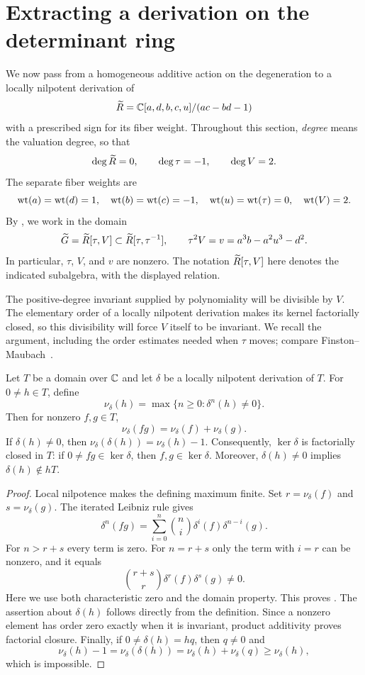 \section{Extracting a derivation on the determinant ring}
\label{sec:reduction}

We now pass from a homogeneous additive action on the degeneration to a
locally nilpotent derivation of
\[
  \widetilde R=\mathbb C[a,d,b,c,u]/(ac-bd-1)
\]
with a prescribed sign for its fiber weight.  Throughout this section,
\emph{degree} means the valuation degree, so that
\[
  \deg \widetilde R=0,\qquad \deg\tau=-1,\qquad \deg V=2.
\]
The separate fiber weights are
\[
  \operatorname{wt}(a)=\operatorname{wt}(d)=1,\quad \operatorname{wt}(b)=\operatorname{wt}(c)=-1,\quad
  \operatorname{wt}(u)=\operatorname{wt}(\tau)=0,\quad \operatorname{wt}(V)=2.
\]
By , we work in the domain
\begin{equation}\label{red:ring}
  \widetilde G=\widetilde R[\tau,V]\subset\widetilde R[\tau,\tau^{-1}],
  \qquad \tau^2V=v=a^3b-a^2u^3-d^2.
\end{equation}
In particular, $\tau$, $V$, and $v$ are nonzero.  The notation
$\widetilde R[\tau,V]$ here denotes the indicated subalgebra, with the displayed
relation.

The positive-degree invariant supplied by polynomiality will be
divisible by $V$. The elementary order of a locally nilpotent
derivation makes its kernel factorially closed, so this divisibility
will force $V$ itself to be invariant. We recall the argument,
including the order estimates needed when $\tau$ moves; compare
Finston--Maubach~\cite[Lemma~1.1]{FinstonMaubach}.

\begin{lemma}
\label{lem:lnd-order}
Let $T$ be a domain over $\mathbb C$ and let $\delta$ be a locally nilpotent
derivation of $T$.  For $0\ne h\in T$, define
\[
  \nu_\delta(h)=\max\{n\ge0:\delta^n(h)\ne0\}.
\]
Then for nonzero $f,g\in T$,
\begin{equation}\label{red:order-product}
  \nu_\delta(fg)=\nu_\delta(f)+\nu_\delta(g).
\end{equation}
If $\delta(h)\ne0$, then
$\nu_\delta(\delta(h))=\nu_\delta(h)-1$.
Consequently, $\ker\delta$ is factorially closed in $T$: if
$0\ne fg\in\ker\delta$, then $f,g\in\ker\delta$.
Moreover, $\delta(h)\ne0$ implies $\delta(h)\notin hT$.
\end{lemma}

\begin{proof}
Local nilpotence makes the defining maximum finite.  Set
$r=\nu_\delta(f)$ and $s=\nu_\delta(g)$.  The iterated Leibniz rule gives
\[
  \delta^n(fg)=\sum_{i=0}^n\binom ni\delta^i(f)\delta^{n-i}(g).
\]
For $n>r+s$ every term is zero.  For $n=r+s$ only the term with $i=r$
can be nonzero, and it equals
\[
  \binom{r+s}{r}\delta^r(f)\delta^s(g)\ne0.
\]
Here we use both characteristic zero and the domain property.  This
proves .  The assertion about $\delta(h)$ follows
directly from the definition.  Since a nonzero element has order zero
exactly when it is invariant, product additivity proves factorial
closure.  Finally, if $0\ne\delta(h)=hq$, then $q\ne0$ and
\[
  \nu_\delta(h)-1
    =\nu_\delta(\delta(h))
    =\nu_\delta(h)+\nu_\delta(q)
    \ge\nu_\delta(h),
\]
which is impossible.
\end{proof}

